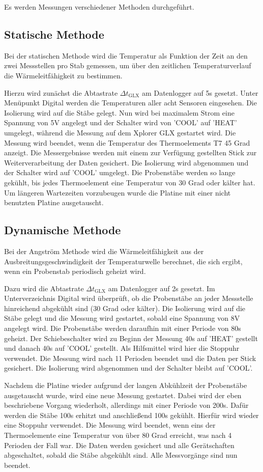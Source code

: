 Es werden Messungen verschiedener Methoden durchgeführt.

\subsection{Statische Methode}
Bei der statischen Methode wird die Temperatur als Funktion der Zeit an den zwei Messstellen pro Stab gemessen, um über den zeitlichen Temperaturverlauf die Wärmeleitfähigkeit zu bestimmen.

Hierzu wird zunächst die Abtastrate $\Delta t_\text{GLX}$ am Datenlogger auf 5s gesetzt.
Unter Menüpunkt Digital werden die Temperaturen aller acht Sensoren eingesehen.
Die Isolierung wird auf die Stäbe gelegt.
Nun wird bei maximalem Strom eine Spannung von 5V angelegt und der Schalter wird von 'COOL' auf 'HEAT' umgelegt,
während die Messung auf dem Xplorer GLX gestartet wird.
Die Messung wird beendet, wenn die Temperatur des Thermoelements T7 45 Grad anzeigt.
Die Messergebnisse werden mit einem zur Verfügung gestellten Stick zur Weiterverarbeitung der Daten gesichert.
Die Isolierung wird abgenommen und der Schalter wird auf 'COOL' umgelegt.
Die Probenstäbe werden so lange gekühlt, bis jedes Thermoelement eine Temperatur von 30 Grad oder kälter hat.
Um längeren Wartezeiten vorzubeugen wurde die Platine mit einer nicht benutzten Platine ausgetauscht.

\subsection{Dynamische Methode}
Bei der Angström Methode wird die Wärmeleitfähigkeit aus der Ausbreitungsgeschwindigkeit der Temperaturwelle berechnet,
die sich ergibt, wenn ein Probenstab periodisch geheizt wird.

Dazu wird die Abtastrate $\Delta t_\text{GLX}$ am Datenlogger auf 2s gesetzt.
Im Unterverzeichnis Digital wird überprüft, ob die Probenstäbe an jeder Messstelle hinreichend abgekühlt sind (30 Grad oder kälter).
Die Isolierung wird auf die Stäbe gelegt und die Messung wird gestartet, sobald eine Spannung von 8V angelegt wird.
Die Probenstäbe werden daraufhin mit einer Periode von 80s geheizt.
Der Schiebeschalter wird zu Beginn der Messung 40s auf 'HEAT' gestellt und danach 40s auf 'COOL' gestellt.
Als Hilfsmittel wird hier die Stoppuhr verwendet.
Die Messung wird nach 11 Perioden beendet und die Daten per Stick gesichert.
Die Isolierung wird abgenommen und der Schalter bleibt auf 'COOL'.

Nachdem die Platine wieder aufgrund der langen Abkühlzeit der Probenstäbe ausgetauscht wurde, wird eine neue Messung gestartet.
Dabei wird der eben beschriebene Vorgang wiederholt, allerdings mit einer Periode von 200s.
Dafür werden die Stäbe 100s erhitzt und anschließend 100s gekühlt.
Hierfür wird wieder eine Stoppuhr verwendet.
Die Messung wird beendet, wenn eins der Thermoelemente eine Temperatur von über 80 Grad erreicht, was nach 4 Perioden der Fall war. 
Die Daten werden gesichert und alle Gerätschaften abgeschaltet, sobald die Stäbe abgekühlt sind.
Alle Messvorgänge sind nun beendet.
